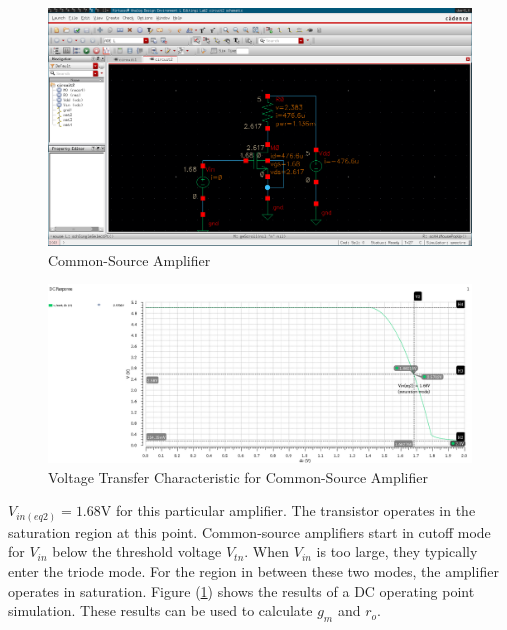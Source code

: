 
\FloatBarrier

\begin{figure}[h!]
	\centering
	\includegraphics[scale=0.45]{../images/circuit2.PNG}
	\caption{Common-Source Amplifier}
	\label{fig:circuit2}
\end{figure}

\FloatBarrier

\FloatBarrier

\begin{figure}[h!]
	\centering
	\includegraphics[scale=0.45]{../images/sim2_vtc.PNG}
	\caption{Voltage Transfer Characteristic for Common-Source Amplifier}
	\label{fig:sim2_vtc}
\end{figure}

\FloatBarrier
$V_{in(eq2)} = 1.68$\si{\volt} for this particular amplifier.
The transistor operates in the saturation region at this point.
Common-source amplifiers start in cutoff mode for $V_{in}$ below the threshold voltage $V_{tn}$.
When $V_{in}$ is too large, they typically enter the triode mode.
For the region in between these two modes, the amplifier operates in saturation.
Figure (\ref{fig:circuit2}) shows the results of a DC operating point simulation.
These results can be used to calculate $g_{m}$ and $r_{o}$.

